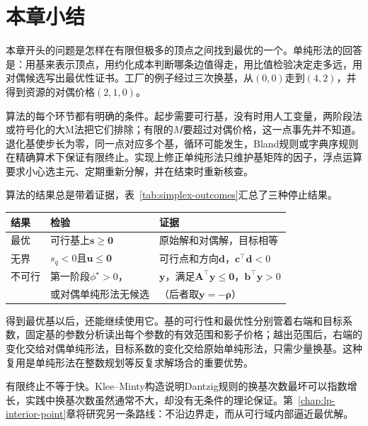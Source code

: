 \section{本章小结}
\label{sec:simplex-summary}

本章开头的问题是怎样在有限但极多的顶点之间找到最优的一个。单纯形法的回答是：用基来表示顶点，用约化成本判断哪条边值得走，用比值检验决定走多远，用对偶候选写出最优性证书。工厂的例子经过三次换基，从$(0,0)$走到$(4,2)$，并得到资源的对偶价格$(2,1,0)$。

算法的每个环节都有明确的条件。起步需要可行基，没有时用人工变量，两阶段法或符号化的大M法把它们排除；有限的$M$要超过对偶价格，这一点事先并不知道。退化基使步长为零，同一点对应多个基，循环可能发生，Bland规则或字典序规则在精确算术下保证有限终止。实现上修正单纯形法只维护基矩阵的因子，浮点运算要求小心选主元、定期重新分解，并在结束时重新核查。

算法的结果总是带着证据，表~\ref{tab:simplex-outcomes}汇总了三种停止结果。

\begin{BookInlineTable}
 \centering
 \begin{tabular}{lll}
  \toprule
  结果 & 检验 & 证据\\
  \midrule
  最优 & 可行基上$\bm{s}\geq\bm{0}$ & 原始解和对偶解，目标相等\\
  无界 & $s_q<0$且$\bm{u}\leq\bm{0}$ & 可行点和方向$\bm{d}$，$\bm{c}^\top\bm{d}<0$\\
  不可行 & 第一阶段$\phi^\star>0$，& $\bm{y}$，满足$\bm{A}^\top\bm{y}\leq\bm{0}$，$\bm{b}^\top\bm{y}>0$\\
  & 或对偶单纯形法无候选 & （后者取$\bm{y}=-\bm{\rho}$）\\
  \bottomrule
 \end{tabular}
 \caption{单纯形法的三种停止结果及其证据。}
 \label{tab:simplex-outcomes}
\end{BookInlineTable}

得到最优基以后，还能继续使用它。基的可行性和最优性分别管着右端和目标系数，固定基的参数分析读出每个参数的有效范围和影子价格；越出范围后，右端的变化交给对偶单纯形法，目标系数的变化交给原始单纯形法，只需少量换基。这种复用是单纯形法在整数规划等反复求解场合的重要优势。

有限终止不等于快。Klee--Minty构造说明Dantzig规则的换基次数最坏可以指数增长，实践中换基次数虽然通常不大，却没有无条件的理论保证。第~\ref{chap:lp-interior-point}章将研究另一条路线：不沿边界走，而从可行域内部逼近最优解。
